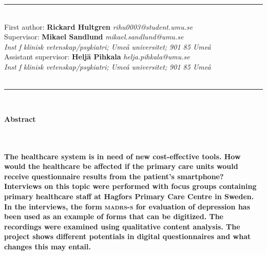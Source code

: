 \documentclass[12pt,a4paper,oneside]{article}
\renewcommand{\abstractname}{Abstract}
\renewenvironment{abstract}
 {\small
  \vspace{1em}\hspace{-1.5em}\bfseries \abstractname\vspace{-.5em}\vspace{0pt}
  \list{}{%
    \setlength{\leftmargin}{0mm}%
    \setlength{\rightmargin}{\leftmargin}%
  }%
  \item\relax}
 {\endlist}
\begin{document}
\date{}
\maketitle
\vspace{-0.9cm}
\hrule
\ \\
{\small First author:} {\small \bf Rickard Hultgren} {\small \it rihu0003@student.umu.se}\vspace{.25cm}\\
 {\small Supervisor:} {\small \bf Mikael Sandlund} {\small \it mikael.sandlund@umu.se}\\
 {\small\it Inst f klinisk vetenskap/psykiatri; Ume\r{a} universitet; 901 85 Ume\r{a}}\vspace{.25cm}\\
 {\small Assistant supervisor:} {\small \bf Helj{\"a} Pihkala} {\small \it helja.pihkala@umu.se}\\
 {\small\it Inst f klinisk vetenskap/psykiatri; Ume\r{a} universitet; 901 85 Ume\r{a}}\vspace{.5cm}\\
{}\\
\hrule
\ \\
\selectfont

\begin{abstract}
\ \\\vspace{-2em}\ \\
\bfseries{
The healthcare system is in need of new cost-effective tools. How would the healthcare be affected if the primary care units would receive questionnaire results from the patient's smartphone? Interviews on this topic were performed with focus groups containing primary healthcare staff at Hagfors Primary Care Centre in Sweden. In the interviews, the form \textbf{\textsc{madrs-s}} for evaluation of depression has been used as an example of forms that can be digitized. The recordings were examined using qualitative content analysis. The project shows different potentials in digital questionnaires and what changes this may entail.
}
\end{abstract}
\end{document}
